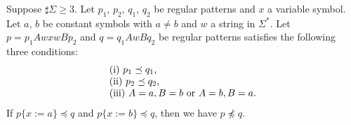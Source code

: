 %
%
\begin{lem}\label{Sato1:Lemma13}
    Suppose $\sharp\Sigma \geq 3$.
    Let $p_{1}$, $p_{2}$, $q_{1}$, $q_{2}$ be regular patterns and $x$ a variable symbol.
    Let $a$, $b$ be constant symbols with $a \neq b$ and $w$ a string in $\Sigma^{\ast}$.
    Let $p = p_{1}AwxwBp_{2}$ and $q = q_{1}AwBq_{2}$ be regular patterns satisfies the following three conditions:
    \[
        \begin{tabular}{ll}
            $\mathrm{(i)}~p_{1} \preceq q_{1}$,  \\
            $\mathrm{(ii)}~p_{2} \preceq q_{2}$, \\
            $\mathrm{(iii)}~A=a, B=b$ or $A=b, B=a$.
        \end{tabular}
    \]
    If $p\{x:=a\} \preceq q$ and $p\{x:=b\} \preceq q$,
    then we have $p \not\preceq q$.
\end{lem}

